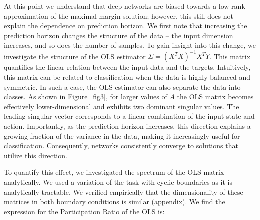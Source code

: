 \documentclass{article}
\begin{document}
At this point we understand that deep networks are biased towards a low rank approximation of the maximal margin solution; however, this still does not explain the dependence on prediction horizon. We first note that increasing the prediction horizon changes the structure of the data -- the input dimension increases, and so does the number of samples. To gain insight into this change, we investigate the structure of the OLS estimator $\Sigma=(X^TX)^{-1}X^TY$. This matrix quantifies the linear relation between the input data and the targets. Intuitively, this matrix can be related to classification when the data is highly balanced and symmetric. In such a case, the OLS estimator can also separate the data into classes. As shown in Figure~\ref{fig3}, for larger values of $A$ the OLS matrix becomes effectively lower-dimensional and exhibits two dominant singular values. The leading singular vector corresponds to a linear combination of the input state and action. Importantly, as the prediction horizon increases, this direction explains a growing fraction of the variance in the data, making it increasingly useful for classification. Consequently, networks consistently converge to solutions that utilize this direction.




To quantify this effect, we investigated the spectrum of the OLS matrix analytically. We used a variation of the task with cyclic boundaries as it is analytically tractable. We verified empirically that the dimensionality of these matrices in both boundary conditions is similar (appendix). We find the expression for the Participation Ratio of the OLS is:
\end{document}
